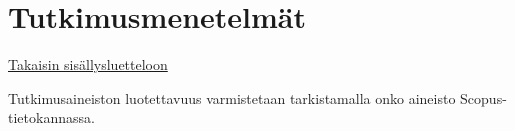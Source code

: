 \section{Tutkimusmenetelmät}
\label{sec:menetelmat}
\hyperlink{index}{Takaisin sisällysluetteloon}

Tutkimusaineiston luotettavuus varmistetaan tarkistamalla onko aineisto Scopus-tietokannassa.